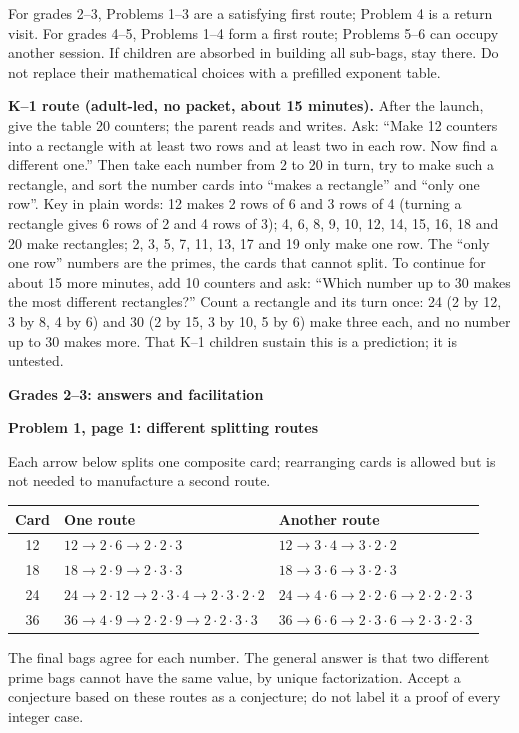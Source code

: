 \documentclass[11pt]{article}
\newcommand{\head}[1]{\par\textbf{\large #1}\par}
\newcommand{\sub}[1]{\par\textbf{#1}\par}
\begin{document}
For grades 2--3, Problems 1--3 are a satisfying first route; Problem 4 is a return visit. For grades 4--5, Problems 1--4 form a first route; Problems 5--6 can occupy another session. If children are absorbed in building all sub-bags, stay there. Do not replace their mathematical choices with a prefilled exponent table.

\textbf{K--1 route (adult-led, no packet, about 15 minutes).} After the launch, give the table 20 counters; the parent reads and writes. Ask: ``Make 12 counters into a rectangle with at least two rows and at least two in each row. Now find a different one.'' Then take each number from 2 to 20 in turn, try to make such a rectangle, and sort the number cards into ``makes a rectangle'' and ``only one row''. Key in plain words: 12 makes 2 rows of 6 and 3 rows of 4 (turning a rectangle gives 6 rows of 2 and 4 rows of 3); 4, 6, 8, 9, 10, 12, 14, 15, 16, 18 and 20 make rectangles; 2, 3, 5, 7, 11, 13, 17 and 19 only make one row. The ``only one row'' numbers are the primes, the cards that cannot split. To continue for about 15 more minutes, add 10 counters and ask: ``Which number up to 30 makes the most different rectangles?'' Count a rectangle and its turn once: 24 (2 by 12, 3 by 8, 4 by 6) and 30 (2 by 15, 3 by 10, 5 by 6) make three each, and no number up to 30 makes more. That K--1 children sustain this is a prediction; it is untested.
\newpage
\head{Grades 2--3: answers and facilitation}
\sub{Problem 1, page 1: different splitting routes}
Each arrow below splits one composite card; rearranging cards is allowed but is not needed to manufacture a second route.
\begin{center}\small
\begin{tabular}{c p{6.2cm} p{6.2cm}}
\toprule Card & One route & Another route \\\midrule
12 & $12\to2\cdot6\to2\cdot2\cdot3$ & $12\to3\cdot4\to3\cdot2\cdot2$\\
18 & $18\to2\cdot9\to2\cdot3\cdot3$ & $18\to3\cdot6\to3\cdot2\cdot3$\\
24 & $24\to2\cdot12\to2\cdot3\cdot4\to2\cdot3\cdot2\cdot2$ & $24\to4\cdot6\to2\cdot2\cdot6\to2\cdot2\cdot2\cdot3$\\
36 & $36\to4\cdot9\to2\cdot2\cdot9\to2\cdot2\cdot3\cdot3$ & $36\to6\cdot6\to2\cdot3\cdot6\to2\cdot3\cdot2\cdot3$\\\bottomrule
\end{tabular}\end{center}
The final bags agree for each number. The general answer is that two different prime bags cannot have the same value, by unique factorization. Accept a conjecture based on these routes as a conjecture; do not label it a proof of every integer case.
\end{document}
